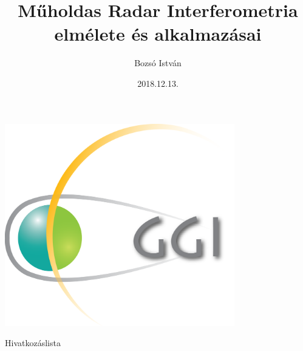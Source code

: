 \documentclass[aspectratio=169]{beamer}
\title[Műholdas Távérzékelés Labor, 2018/19.I.]{Műholdas Radar Interferometria elmélete és alkalmazásai}
\author[Bozsó István]{Bozsó István}
\institute[MTA CSFK GGI]{MTA CSFK Geodéziai és Geofizikai Intézet}
\date{2018.12.13.}
\begin{document}
\begin{frame}
    \titlepage
    \begin{center}
        \begin{minipage}[c]{0.3\textwidth}
            \includegraphics[width=0.75\textwidth]{ggi_logo.png}
        \end{minipage}
    \end{center}
\end{frame}











\begin{frame}{Hivatkozáslista}
    
        
\end{frame}
\end{document}
